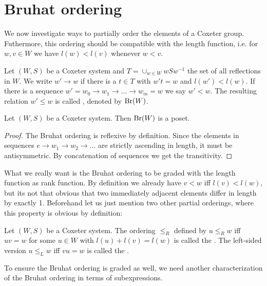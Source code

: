 \section{Bruhat ordering}
\label{sec:coxeter-groups-bruhat-ordering}

We now investigate ways to partially order the elements of a Coxeter group. Futhermore, this ordering should be compatible with the length function, i.e. for $w,v \in W$ we have $l(w) < l(v)$ whenever $w < v$.

\begin{defi}
	Let $(W,S)$ be a Coxeter system and $T = \cup_{w \in W} wSw^{-1}$ the set of all reflections in $W$. We write $w' \to w$ if there is a $t \in T$ with $w't = w$ and $l(w') < l(w)$. If there is a sequence $w' = w_0 \to w_1 \to \ldots \to w_m = w$ we say $w' < w$. The resulting relation $w' \leq w$ is called , denoted by $\operatorname{Br}(W)$.
\end{defi}

\begin{lemm}
	Let $(W,S)$ be a Coxeter system. Then $\operatorname{Br}(W)$ is a poset.

	\begin{proof}
		The Bruhat ordering is reflexive by definition. Since the elements in sequences $e \to w_1 \to w_2 \to \ldots$ are strictly ascending in length, it must be antisymmetric. By concatenation of sequences we get the transitivity.
	\end{proof}
\end{lemm}

What we really want is the Bruhat ordering to be graded with the length function as rank function. By definition we already have $v < w$ iff $l(v) < l(w)$, but its not that obvious that two immediately adjacent elements differ in length by exactly 1. Beforehand let us just mention two other partial orderings, where this property is obvious by definition:

\begin{defi}
	Let $(W,S)$ be a Coxeter system. The ordering $\leq_R$ defined by $u \leq_R w$ iff $uv = w$ for some $u \in W$ with $l(u) + l(v) = l(w)$ is called the . The left-sided version $u \leq_L w$ iff $vu = w$ is called the .
\end{defi}

To ensure the Bruhat ordering is graded as well, we need another characterization of the Bruhat ordering in terms of subexpressions.

